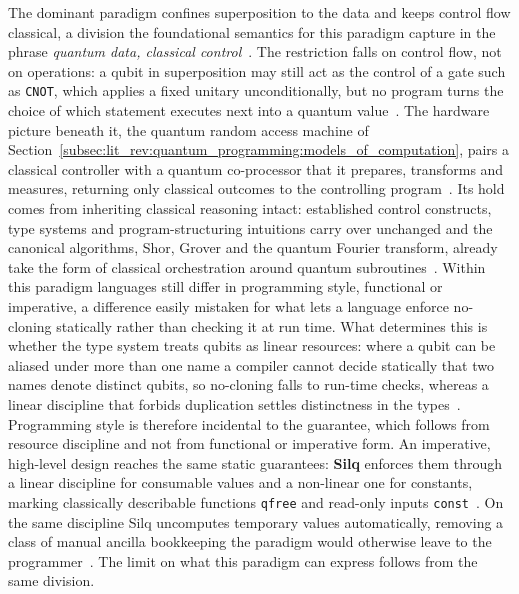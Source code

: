 The dominant paradigm confines superposition to the data and keeps control flow classical, a division the foundational semantics for this paradigm capture in the phrase \textit{quantum data, classical control}~\cite{selinger2004towards}.
The restriction falls on control flow, not on operations: a qubit in superposition may still act as the control of a gate such as \texttt{CNOT}, which applies a fixed unitary unconditionally, but no program turns the choice of which statement executes next into a quantum value~\cite{selinger2004towards}.
The hardware picture beneath it, the quantum random access machine of Section~\ref{subsec:lit_rev:quantum_programming:models_of_computation}, pairs a classical controller with a quantum co-processor that it prepares, transforms and measures, returning only classical outcomes to the controlling program~\cite{knill1996pseudocode, wang2023qrasp}.
Its hold comes from inheriting classical reasoning intact: established control constructs, type systems and program-structuring intuitions carry over unchanged and the canonical algorithms, Shor, Grover and the quantum Fourier transform, already take the form of classical orchestration around quantum subroutines~\cite{selinger2004towards}.
Within this paradigm languages still differ in programming style, functional or imperative, a difference easily mistaken for what lets a language enforce no-cloning statically rather than checking it at run time.
What determines this is whether the type system treats qubits as linear resources: where a qubit can be aliased under more than one name a compiler cannot decide statically that two names denote distinct qubits, so no-cloning falls to run-time checks, whereas a linear discipline that forbids duplication settles distinctness in the types~\cite{selinger2004towards}.
Programming style is therefore incidental to the guarantee, which follows from resource discipline and not from functional or imperative form.
An imperative, high-level design reaches the same static guarantees: \textbf{Silq} enforces them through a linear discipline for consumable values and a non-linear one for constants, marking classically describable functions \texttt{qfree} and read-only inputs \texttt{const}~\cite{bichsel2020silq}.
On the same discipline Silq uncomputes temporary values automatically, removing a class of manual ancilla bookkeeping the paradigm would otherwise leave to the programmer~\cite{bichsel2020silq}.
The limit on what this paradigm can express follows from the same division.

